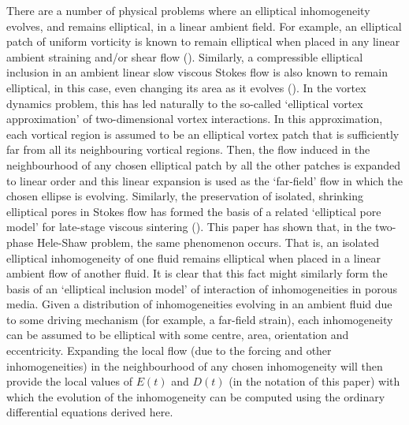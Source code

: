 \documentclass[fleqn]{jleo}
\begin{document}
There are a number of physical problems where an elliptical inhomogeneity
evolves, and remains elliptical, in a linear ambient field. For example,
an elliptical patch of uniform vorticity is known to remain elliptical when
placed in any linear ambient straining and/or shear flow (\citealt{PGS}).  Similarly,
a compressible elliptical inclusion in an ambient linear slow viscous Stokes
flow is also known to remain elliptical, in this case, even changing its
area as it evolves (\citealt{Cro1}). In the vortex dynamics problem, this has
led naturally to the so-called `elliptical vortex approximation' of two-dimensional
vortex interactions. In this approximation, each vortical region is assumed
to be an elliptical vortex patch that is sufficiently far from all its neighbouring
vortical regions.  Then, the flow induced in the neighbourhood of any chosen
elliptical patch by all the other patches is expanded to linear order and
this linear expansion is used as the `far-field' flow in which the chosen
ellipse is evolving. Similarly, the preservation of isolated, shrinking elliptical
pores in Stokes flow has formed the basis of a related `elliptical pore model'
for late-stage viscous sintering (\citealt{Cro2}). This paper has shown that,
in the two-phase Hele-Shaw problem, the same phenomenon occurs. That is,
an isolated elliptical inhomogeneity of one fluid remains elliptical when
placed in a linear ambient flow of another fluid. It is clear that this fact
might similarly form the basis of an `elliptical inclusion model' of interaction
of inhomogeneities in porous media. Given a distribution of inhomogeneities
evolving in an ambient fluid due to some driving mechanism (for example,
a far-field strain), each inhomogeneity can be assumed to be elliptical with
some centre, area, orientation and eccentricity. Expanding the local flow
(due to the forcing and other inhomogeneities) in the neighbourhood of any
chosen inhomogeneity will then provide the local values of $E(t)$ and $D(t)$
(in the notation of this paper) with which the evolution of the inhomogeneity
can be computed using the ordinary differential equations derived here.
\end{document}
